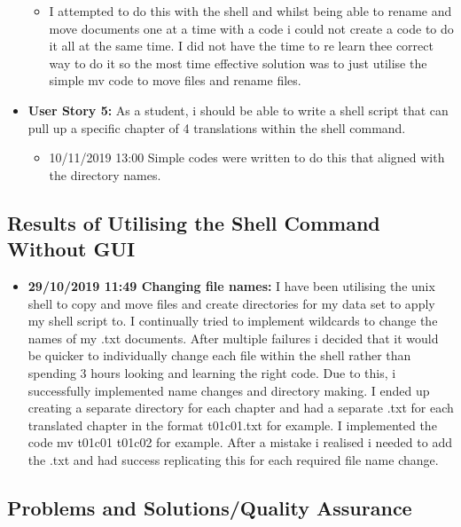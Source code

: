 \documentclass{article}
\begin{document}
\begin{itemize}
\begin{itemize}
\item{I attempted to do this with the shell and whilst being able to rename and move documents one at a time with a code i could not create a code to do it all at the same time. I did not have the time to re learn thee correct way to do it so the most time effective solution was to just utilise the simple mv code to move files and rename files.}
\end{itemize}
\item{\textbf{User Story 5:} As a student, i should be able to write a shell script that can pull up a specific chapter of 4 translations within the shell command.}
\begin{itemize}
\item{10/11/2019 13:00 Simple codes were written to do this that aligned with the directory names.} 
\end{itemize}
    
\end{itemize}


\subsection{Results of Utilising the Shell Command Without GUI}

\begin{itemize}
    \item{\textbf{ 29/10/2019 11:49 Changing file names:} I have been utilising the unix shell to copy and move files and create directories for my data set to apply my shell script to. I continually tried to implement wildcards to change the names of my .txt documents. After multiple failures i decided that it would be quicker to individually change each file within the shell rather than spending 3 hours looking and learning the right code. Due to this, i successfully implemented name changes and directory making. I ended up creating a separate directory for each chapter and had a separate .txt for each translated chapter in the format t01c01.txt for example. I implemented the code mv t01c01 t01c02 for example. After a mistake i realised i needed to add the .txt and had success replicating this for each required file name change.} 
\end{itemize}


\subsection{Problems and Solutions/Quality Assurance}
\end{document}
